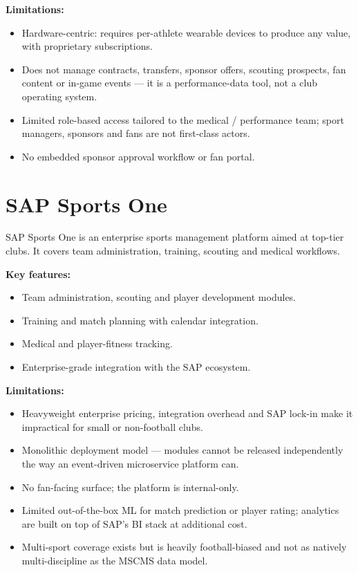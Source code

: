 \documentclass[12pt,a4paper,oneside]{report}
\begin{document}
\textbf{Limitations:}
\begin{itemize}[leftmargin=*]
  \item Hardware-centric: requires per-athlete wearable devices to
        produce any value, with proprietary subscriptions.
  \item Does not manage contracts, transfers, sponsor offers, scouting
        prospects, fan content or in-game events --- it is a
        performance-data tool, not a club operating system.
  \item Limited role-based access tailored to the medical /
        performance team; sport managers, sponsors and fans are not
        first-class actors.
  \item No embedded sponsor approval workflow or fan portal.
\end{itemize}

\section{SAP Sports One}
\label{sec:prevwork-sap}
SAP Sports One is an enterprise sports management platform aimed at
top-tier clubs. It covers team administration, training, scouting and
medical workflows.

\textbf{Key features:}
\begin{itemize}[leftmargin=*]
  \item Team administration, scouting and player development modules.
  \item Training and match planning with calendar integration.
  \item Medical and player-fitness tracking.
  \item Enterprise-grade integration with the SAP ecosystem.
\end{itemize}

\textbf{Limitations:}
\begin{itemize}[leftmargin=*]
  \item Heavyweight enterprise pricing, integration overhead and SAP
        lock-in make it impractical for small or non-football clubs.
  \item Monolithic deployment model --- modules cannot be released
        independently the way an event-driven microservice platform
        can.
  \item No fan-facing surface; the platform is internal-only.
  \item Limited out-of-the-box ML for match prediction or player
        rating; analytics are built on top of SAP's BI stack at
        additional cost.
  \item Multi-sport coverage exists but is heavily football-biased and
        not as natively multi-discipline as the MSCMS data model.
\end{itemize}
\end{document}
